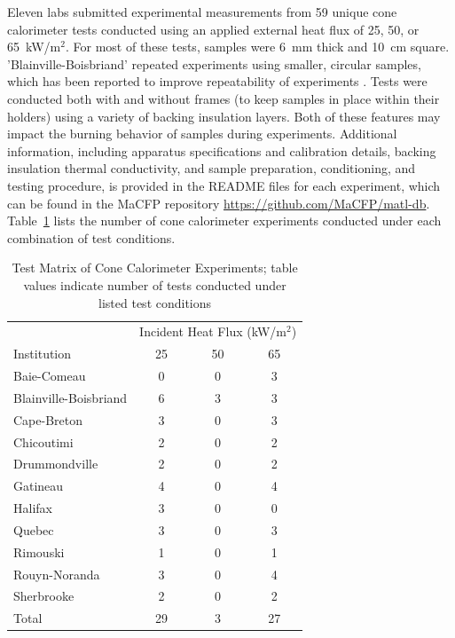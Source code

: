 \documentclass{book}
\begin{document}
Eleven labs submitted experimental measurements from 59 unique cone calorimeter tests conducted using an applied external heat flux of 25, 50, or 65~kW/m$^2$. For most of these tests, samples were 6~mm thick and 10~cm square. 'Blainville-Boisbriand' repeated experiments using smaller, circular samples, which has been reported to improve repeatability of experiments \cite{vermina2019experimental}. Tests were conducted both with and without frames (to keep samples in place within their holders) using a variety of backing insulation layers. Both of these features may impact the burning behavior of samples during experiments. Additional information, including apparatus specifications and calibration details, backing insulation thermal conductivity, and sample preparation, conditioning, and testing procedure, is provided in the README files for each experiment, which can be found in the MaCFP repository \href{https://github.com/MaCFP/matl-db}{https://github.com/MaCFP/matl-db}. Table~\ref{Table_6} lists the number of cone calorimeter experiments conducted under each combination of test conditions.

\begin{table}[ht]
\caption{Test Matrix of Cone Calorimeter Experiments; table values indicate number of tests conducted under listed test conditions}
\label{Table_6}
\begin{center}
\begin{tabular}{lccc}
\hline
                        & \multicolumn{3}{c}{Incident Heat Flux (kW/m$^2$)} \\ %
Institution             & 25 & 50 & 65       \\ \hline
Baie-Comeau             & 0     & 0     & 3  \\
Blainville-Boisbriand   & 6     & 3     & 3  \\
Cape-Breton             & 3     & 0     & 3  \\
Chicoutimi              & 2     & 0     & 2  \\
Drummondville           & 2     & 0     & 2  \\
Gatineau                & 4     & 0     & 4  \\
Halifax                 & 3     & 0     & 0  \\
Quebec                  & 3     & 0     & 3  \\
Rimouski                & 1     & 0     & 1  \\
Rouyn-Noranda           & 3     & 0     & 4  \\
Sherbrooke              & 2     & 0     & 2  \\ \hline
Total                   & 29    & 3     & 27 \\ \hline
\end{tabular}
\end{center}
\end{table}
\end{document}
